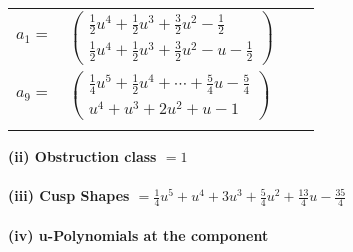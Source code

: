 \documentclass[1p]{elsarticle_modified}
\theoremstyle{definition}
\begin{document}
\begin{tabular}{m{7pt} m{180pt} m{7pt} m{180pt} }
\flushright $a_{1}=$&$\begin{pmatrix}\frac{1}{2} u^4+\frac{1}{2} u^3+\frac{3}{2} u^2-\frac{1}{2}\\\frac{1}{2} u^4+\frac{1}{2} u^3+\frac{3}{2} u^2- u-\frac{1}{2}\end{pmatrix}$ \\
\flushright $a_{9}=$&$\begin{pmatrix}\frac{1}{4} u^5+\frac{1}{2} u^4+\cdots+\frac{5}{4} u-\frac{5}{4}\\u^4+u^3+2 u^2+u-1\end{pmatrix}$\\&\end{tabular}
\flushleft \textbf{(ii) Obstruction class $= 1$}\\~\\
\flushleft \textbf{(iii) Cusp Shapes $= \frac{1}{4} u^5+u^4+3 u^3+\frac{5}{4} u^2+\frac{13}{4} u-\frac{35}{4}$}\\~\\
\newpage\renewcommand{\arraystretch}{1}
\flushleft \textbf{(iv) u-Polynomials at the component}\newline \\
\end{document}
